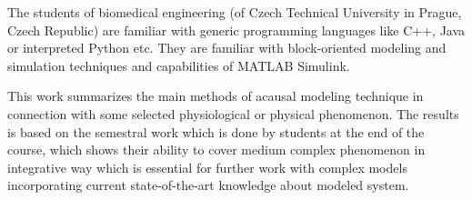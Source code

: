 \documentclass[letterpaper, 10 pt, conference]{ieeeconf}  %
\begin{document}
The students of biomedical engineering (of Czech Technical University in Prague, Czech Republic) are familiar with generic programming languages like C++, Java or interpreted Python etc. They are familiar with block-oriented modeling and simulation techniques and capabilities of MATLAB Simulink. 

This work summarizes the main methods of acausal modeling technique in connection with some selected physiological or physical phenomenon. The results is based on the semestral work which is done by students at the end of the course, which shows their ability to cover medium complex phenomenon in integrative way which is essential for further work with complex models incorporating current state-of-the-art knowledge about modeled system.




\end{document}
